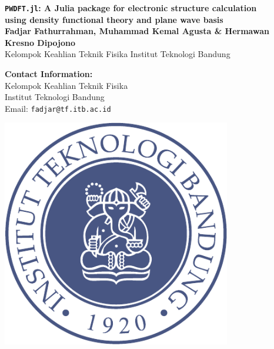 \documentclass[a0,landscape]{a0poster}
\begin{document}

\begin{minipage}[b]{0.60\linewidth}
{\Huge \color{NavyBlue} \textbf{\texttt{PWDFT.jl}: A Julia package for electronic structure calculation \\
using density functional theory and plane wave basis} \color{Black}}\\
\huge \textbf{Fadjar Fathurrahman, Muhammad Kemal Agusta \& Hermawan Kresno Dipojono }\\ %
\huge Kelompok Keahlian Teknik Fisika Institut Teknologi Bandung \\ %
\end{minipage}
%
\begin{minipage}[b]{0.15\linewidth}
\color{DarkSlateGray}\Large \textbf{Contact Information:}\\
Kelompok Keahlian Teknik Fisika \\ %
Institut Teknologi Bandung \\
Email: \texttt{fadjar@tf.itb.ac.id}\\ %
\end{minipage}
%
\begin{minipage}[b]{0.125\linewidth}
\includegraphics[width=10cm]{ITB_logo.pdf}\\
\end{minipage}
%
\end{document}
